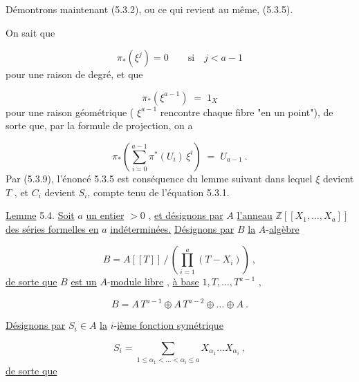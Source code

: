 Démontrons maintenant (5.3.2), ou ce qui revient au même, (5.3.5).



On sait que

\begin{equation*}
\pi_*(\xi^j) = 0 \qquad \mbox{si} \quad j < a-1
\end{equation*}
pour une raison de degré, et que

\begin{equation*}
\pi_*(\xi^{a-1}) \;=\; 1_X
\end{equation*}
pour une raison géométrique ( $\xi^{a-1}$ rencontre chaque fibre "en un point"), de sorte que, par la formule de projection, on a

\begin{equation}\tag{5.3.9}
\pi_*\left( \sum_{i=0}^{a-1} \pi^*(U_i) \, \xi^i \right)
\;=\; U_{a-1} \ .
\end{equation}
Par (5.3.9), l'énoncé 5.3.5 est conséquence du lemme suivant  dans lequel $\xi$ devient $T$ , et $C_i$ devient $S_i$, compte tenu de l'équation 5.3.1.

\underline{Lemme} 5.4. \underline{Soit} $a$ \underline{un entier} $> 0$ , \underline{et désignons par} $A$ \underline{l'anneau} $\mathbb{Z}[[X_1,\ldots,X_a]]$ \underline{des séries formelles en} $a$ \underline{indéterminées.} \underline{Désignons par} $B$ \underline{la} $A$-\underline{algèbre}

\begin{equation*}
B = A[[T]] \, / \, \left( \prod_{i=1}^{a} (T-X_i) \right) \ ,
\end{equation*}
\underline{de sorte que} $B$ \underline{est un} $A$-\underline{module libre} , \underline{à base} $1,T,\ldots,T^{a-1}$ ,

\begin{equation}\tag{5.4.1}
B = A \, T^{a-1} \oplus A \, T^{a-2} \oplus \ldots \oplus A \ .
\end{equation}


\underline{Désignons par} $S_i \in A$ \underline{la} $i$-\underline{ième fonction symétrique}

\begin{equation*}
S_i = \sum_{1 \leq \alpha_1 < \ldots < \alpha_i \leq a} X_{\alpha_1} \ldots X_{\alpha_i} \ ,
\end{equation*}
\underline{de sorte que}

